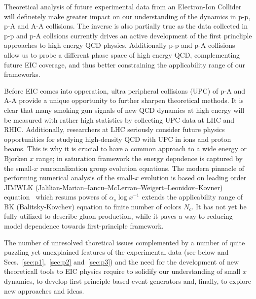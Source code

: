 Theoretical analysis of future experimental data from an Electron-Ion Collider  will 
definetely make greater impact on our understanding of the dynamics in 
p-p, p-A and A-A collisions.  %
The inverse is also partially true as the data collected 
in p-p and p-A collsions currently drives an active 
development of the first princliple approaches to 
high energy QCD physics. Additionally p-p and p-A 
collisions allow us to probe a different phase space 
of high energy  QCD, complementing future EIC coverage, and thus 
better constraining the applicability range of our frameworks. 

Before EIC comes into opperation, ultra peripheral collisions (UPC) 
of p-A and A-A provide a unique opportunity to 
further sharpen theoretical methods. It is clear that 
many smoking gun signals of new QCD dynamics at high energy 
will be measured with rather high statistics 
by collecting UPC data at LHC and RHIC. Additionally, researchers at LHC 
seriously consider 
future physics opportunities for studying high-density QCD 
with UPC in ions and proton beams. This is why it is 
crucial to have a common approach to a wide energy or Bjorken $x$ range; 
in saturation framework the energy depndence  is captured by the small-$x$ 
renromalization group evolution equations.  
The modern pinnacle of performing numerical analysis of the small-$x$ evolution is based on 
leading order  JIMWLK (Jalilian-Marian--Iancu--McLerran--Weigert--Leonidov--Kovner) equation~\cite{JalilianMarian:1997dw, 
JalilianMarian:1997gr,
Iancu:2001ad, 
Iancu:2000hn}  which resums powers of $\alpha_s \log x^{-1}$
extends the applicability range of BK (Balitsky-Kovchev) equation \cite{Balitsky:1995ub,Balitsky:1998ya,Kovchegov:1999yj,Kovchegov:1999ua} to finite number of colors $N_c$. 
It has not yet be fully utilized to describe gluon production, 
while it paves a way to reducing model dependence towards  
first-principle framework.  


The number of unresolved thoretical issues complemented by a number of 
quite puzzling yet unexplained features of the experimental data (see below and  Secs.~\ref{sec:p1},~\ref{sec:p2} and~\ref{sec:p3})  
and the need for the development of new theoreticall tools to EIC physics 
require to solidify our understanding of small $x$ dynamics, 
to develop first-principle based event generators and, finally, to  
explore new approaches and ideas. 


